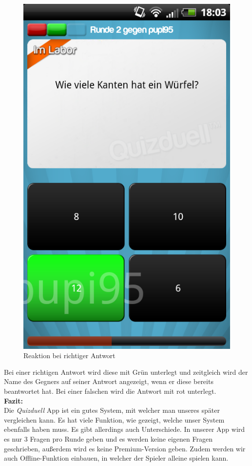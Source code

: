 \documentclass[fontsize=12pt,paper=a4,twoside]{scrartcl}
\begin{document}
\begin{figure}[H]
\centering
\includegraphics[scale=0.5]{Bilder/antwort.png}
\caption{Reaktion bei richtiger Antwort}
\end{figure}

Bei einer richtigen Antwort wird diese mit Grün unterlegt und zeitgleich wird der Name des Gegners auf seiner Antwort angezeigt, wenn er diese bereits beantwortet hat. Bei einer falschen wird die Antwort mit rot unterlegt.\\

\textbf{Fazit:}\\
Die \textit{Quizduell} App ist ein gutes System, mit welcher man unseres später vergleichen kann. Es hat viele Funktion, wie gezeigt, welche unser System ebenfalls haben muss. Es gibt allerdings auch Unterschiede. In unserer App wird es nur 3 Fragen pro Runde geben und es werden keine eigenen Fragen geschrieben, außerdem wird es keine Premium-Version geben. Zudem werden wir auch Offline-Funktion einbauen, in welcher der Spieler alleine spielen kann.\\ 
\end{document}
